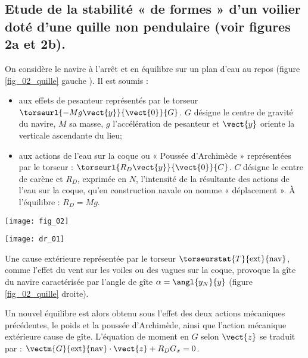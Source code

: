 \subsection{Etude de la stabilité « de formes » d’un voilier doté d’une quille non pendulaire (voir figures 2a et 2b).}

On considère le navire à l’arrêt et en équilibre sur un plan d’eau au repos (figure \ref{fig_02_quille} gauche ). Il est soumis :
\begin{itemize}
\item aux effets de pesanteur représentés par le torseur $\torseurl{-Mg\vect{y}}{\vect{0}}{G}$. $G$ désigne le centre de gravité du navire, $M$ sa masse, $g$ l’accélération de pesanteur et $\vect{y}$ oriente la verticale ascendante du lieu; 
\item aux actions de l’eau sur la coque ou « Poussée d’Archimède » représentées par le torseur : $\torseurl{R_D\vect{y}}{\vect{0}}{C}$. $C$ désigne le centre de carène et $R_D$, exprimée en $N$,  l’intensité  de la résultante des actions de l’eau sur la coque, qu’en construction navale on nomme « déplacement ». À l’équilibre : $R_D = Mg$.
\end{itemize}

\begin{minipage}[c]{.47\linewidth}
\begin{center}
\texttt{[image: fig\_02]}
\end{center}
\end{minipage} \hfill
\begin{minipage}[c]{.47\linewidth}
\begin{center}
\texttt{[image: dr\_01]}
\end{center}
\end{minipage}
Une cause extérieure représentée par le torseur $\torseurstat{T}{\text{ext}}{\text{nav}}$, comme l’effet du vent sur les voiles ou des vagues sur la coque, provoque la gîte du navire caractérisée par l’angle de gîte $\alpha=\angl{{y_N}}{{y}}$  (figure \ref{fig_02_quille} droite).

Un nouvel équilibre est alors obtenu sous l’effet des deux actions mécaniques précédentes, le poids et la poussée d’Archimède, ainsi que l’action mécanique extérieure cause de gîte.
L’équation de moment en $G$ selon $\vect{z}$ se traduit par : $\vectm{G}{\text{ext}}{\text{nav}}\cdot \vect{z} + R_D G_x = 0$.

